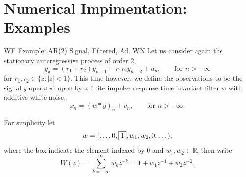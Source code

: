 \documentclass{beamer}  %
\newcommand{\R}{\mathbb{R}}
\begin{document}
\section{Numerical Impimentation: Examples}
\begin{frame}{WF Example: AR(2) Signal, Filtered, Ad. WN}
	Let us consider again the stationary autoregressive process of order 2,
	$$y_n = (r_1+r_2)y_{n-1} - r_1r_2 y_{n-2} + u_n , \qquad \text{for } n > -\infty$$
	for $r_1,r_2 \in \{z : |z|<1\}$.
	This time however, we define the observations to be the signal $y$ operated upon by a finite impulse response time invariant filter $w$ with additive white noise.
	$$x_n = (w * y)_n + v_n, \qquad \text{for } n > -\infty.$$
	
	For simplicity let $$ w = (\dots,0,\fbox{1},w_1, w_2,0,\dots),$$
	where the box indicate the element indexed by 0 and $w_1,w_2 \in \R$, then write
	$$W(z) = \sum_{k = -\infty}^\infty w_k z^{-k} = 1 + w_1 z^{-1} + w_2 z^{-2}.$$
	
\end{frame}	
\end{document}
